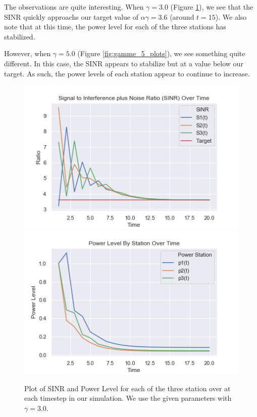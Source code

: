 \documentclass[12pt]{exam}
\begin{document}
\begin{questions}
\begin{solution}
\begin{enumerate}[label=(\alph*)]
  The observations are quite interesting. When $\gamma = 3.0$ (Figure \ref{fig:gamme_3_plots}), we see that the SINR quickly approachs our target value of $\alpha \gamma = 3.6$ (around $t = 15$). We also note that at this time, the power level for each of the three stations has stabilized.

  However, when $\gamma = 5.0$ (Figure \ref{fig:gamme_5_plots}), we see something quite different. In this case, the SINR appears to stabilize but at a value below our target. As such, the power levels of each station appear to continue to increase.

\end{enumerate}
\end{solution}

\begin{figure}[!ht]
  \centering
  \includegraphics[scale=0.5]{figures/sinr_steps_20_gamma_3.png}
  \includegraphics[scale=0.5]{figures/power_level_steps_20_gamma_3.png}
  \caption{Plot of SINR and Power Level for each of the three station over at each timestep in our simulation. We use the given parameters with $\gamma = 3.0$.}
  \label{fig:gamme_3_plots}
\end{figure}


\end{questions}
\end{document}
